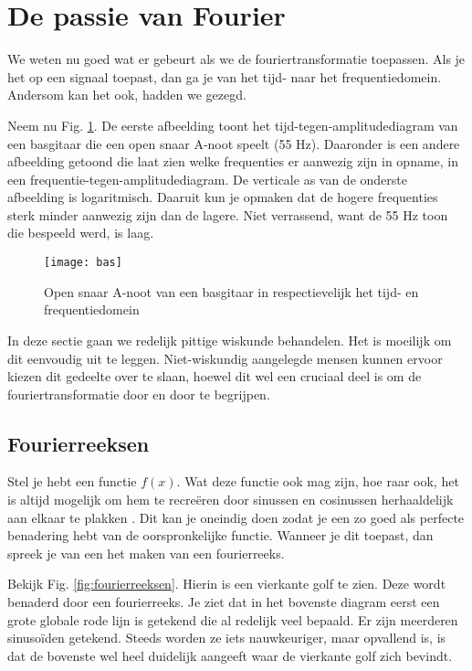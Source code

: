 \documentclass[11pt,fleqn]{book} %
\begin{document}
\section{De passie van Fourier}
We weten nu goed wat er gebeurt als we de fouriertransformatie toepassen. Als je het op een signaal toepast, dan ga je van het tijd- naar het frequentiedomein. Andersom kan het ook, hadden we gezegd.

Neem nu Fig. \ref{fig:bas}. De eerste afbeelding toont het tijd-tegen-amplitudediagram van een basgitaar die een open snaar A-noot speelt (55 Hz). Daaronder is een andere afbeelding getoond die laat zien welke frequenties er aanwezig zijn in opname, in een frequentie-tegen-amplitudediagram. De verticale as van de onderste afbeelding is logaritmisch. Daaruit kun je opmaken dat de hogere frequenties sterk minder aanwezig zijn dan de lagere. Niet verrassend, want de 55 Hz toon die bespeeld werd, is laag.

\begin{figure}[h]
	\centering\texttt{[image: bas]}
	\caption{Open snaar A-noot van een basgitaar in respectievelijk het tijd- en frequentiedomein}
	\label{fig:bas}
\end{figure}

In deze sectie gaan we redelijk pittige wiskunde behandelen. Het is moeilijk om dit eenvoudig uit te leggen. Niet-wiskundig aangelegde mensen kunnen ervoor kiezen dit gedeelte over te slaan, hoewel dit wel een cruciaal deel is om de fouriertransformatie door en door te begrijpen.

\subsection{Fourierreeksen}
Stel je hebt een functie $f(x)$. Wat deze functie ook mag zijn, hoe raar ook, het is altijd mogelijk om hem te recreëren door sinussen en cosinussen herhaaldelijk aan elkaar te plakken \cite{fs}. Dit kan je oneindig doen zodat je een zo goed als perfecte benadering hebt van de oorspronkelijke functie. Wanneer je dit toepast, dan spreek je van een het maken van een fourierreeks.

Bekijk Fig. \ref{fig:fourierreeksen}. Hierin is een vierkante golf te zien. Deze wordt benaderd door een fourierreeks. Je ziet dat in het bovenste diagram eerst een grote globale rode lijn is getekend die al redelijk veel bepaald. Er zijn meerderen sinusoïden getekend. Steeds worden ze iets nauwkeuriger, maar opvallend is, is dat de bovenste wel heel duidelijk aangeeft waar de vierkante golf zich bevindt.
\end{document}
